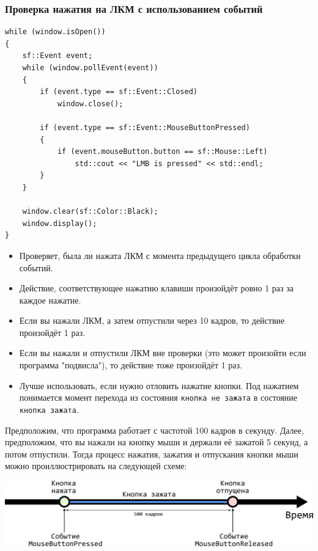 \documentclass{article}
\begin{document}
\subsubsection*{Проверка нажатия на ЛКМ с использованием событий}
\begin{minipage}{0.64\textwidth}
\begin{lstlisting}[frame=none]
while (window.isOpen()) 
{
    sf::Event event;
    while (window.pollEvent(event)) 
    {
        if (event.type == sf::Event::Closed)
            window.close();

        if (event.type == sf::Event::MouseButtonPressed)
        {
            if (event.mouseButton.button == sf::Mouse::Left)
                std::cout << "LMB is pressed" << std::endl; 
        }
    }

    window.clear(sf::Color::Black);
    window.display();
}
\end{lstlisting}
\end{minipage}
\begin{minipage}{0.36\textwidth}
\begin{itemize}
\item Проверяет, была ли нажата ЛКМ с момента предыдущего цикла обработки событий.
\item Действие, соответствующее нажатию клавиши произойдёт ровно 1 раз за каждое нажатие.
\item Если вы нажали ЛКМ, а затем отпустили через 10 кадров, то действие произойдёт 1 раз.
\item Если вы нажали и отпустили ЛКМ вне проверки (это может произойти если программа "подвисла"), то действие тоже произойдёт 1 раз.
\item Лучше использовать, если нужно отловить нажатие кнопки. Под нажатием понимается момент перехода из состояния \texttt{кнопка не зажата} в состояние \texttt{кнопка зажата}.
\end{itemize}
\end{minipage}

\newpage
Предположим, что программа работает с частотой 100 кадров в секунду.
Далее, предположим, что вы нажали на кнопку мыши и держали её зажатой 5 секунд, а потом отпустили.
Тогда процесс нажатия, зажатия и отпускания кнопки мыши можно проиллюстрировать на следующей схеме:
\\

\begin{center}
\includegraphics[scale=1]{../images/mouse_presses.png}
\end{center}
\end{document}
